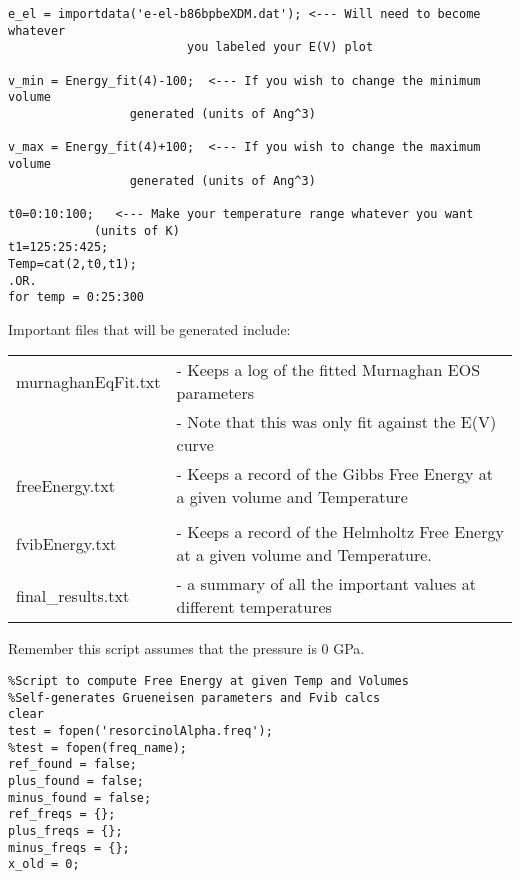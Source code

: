 \documentclass[11pt,letterpaper]{article}
\begin{document}
\begin{spacing}{1.0}
\begin{verbatim}
e_el = importdata('e-el-b86bpbeXDM.dat'); <--- Will need to become whatever
					     you labeled your E(V) plot

v_min = Energy_fit(4)-100;  <--- If you wish to change the minimum volume
				 generated (units of Ang^3)

v_max = Energy_fit(4)+100;  <--- If you wish to change the maximum volume
				 generated (units of Ang^3)

t0=0:10:100;   <--- Make your temperature range whatever you want 
		    (units of K)
t1=125:25:425;
Temp=cat(2,t0,t1);
.OR.
for temp = 0:25:300
\end{verbatim}

Important files that will be generated include:
\vspace{3mm}

\begin{tabular}{ll}
murnaghanEqFit.txt	&- Keeps a log of the fitted Murnaghan EOS parameters \\
	&- Note that this was only fit against the E(V) curve\\
freeEnergy\*.txt	&- Keeps a record of the Gibbs Free Energy at a given volume and Temperature \\
\\
fvibEnergy\*.txt &- Keeps a record of the Helmholtz Free Energy at a given volume and Temperature. \\
final\_results.txt	&- a summary of all the important values at different temperatures \\

\end{tabular}

\vspace{3mm}
Remember this script assumes that the pressure is 0 GPa.
\vspace{3mm}

\begin{verbatim}
%Script to compute Free Energy at given Temp and Volumes
%Self-generates Grueneisen parameters and Fvib calcs
clear
test = fopen('resorcinolAlpha.freq');
%test = fopen(freq_name);
ref_found = false;
plus_found = false;
minus_found = false;
ref_freqs = {};
plus_freqs = {};
minus_freqs = {};
x_old = 0;


\end{verbatim}
\end{spacing}
\end{document}
